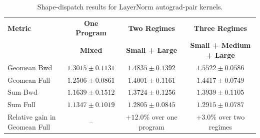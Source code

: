 \documentclass[11pt]{article}
\begin{document}
\begin{table}[h]
\centering
\small
\caption{Shape-dispatch results for LayerNorm autograd-pair kernels.}
\label{tab:dispatch_results}
\begin{tabular}{lccc}
\toprule
\textbf{Metric}
& \textbf{One Program}
& \textbf{Two Regimes}
& \textbf{Three Regimes} \\
& \textbf{Mixed}
& \textbf{Small + Large}
& \textbf{Small + Medium + Large} \\
\midrule
Geomean Bwd
& \(1.3015 \pm 0.1131\)
& \(1.4835 \pm 0.1392\)
& \(1.5522 \pm 0.0586\) \\

Geomean Full
& \(1.2506 \pm 0.0861\)
& \(1.4001 \pm 0.1161\)
& \(1.4417 \pm 0.0749\) \\

Sum Bwd
& \(1.1639 \pm 0.1512\)
& \(1.3724 \pm 0.1256\)
& \(1.3939 \pm 0.1105\) \\

Sum Full
& \(1.1347 \pm 0.1019\)
& \(1.2805 \pm 0.0845\)
& \(1.2915 \pm 0.0787\) \\

\midrule
Relative gain in Geomean Full
& --
& \(+12.0\%\) over one program
& \(+3.0\%\) over two regimes \\
\bottomrule
\end{tabular}
\end{table}




\end{document}
